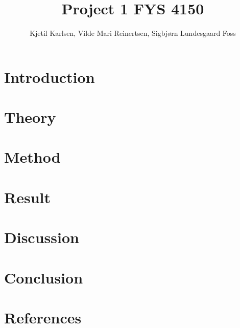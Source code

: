 

\title{Project 1 FYS 4150}
\author{Kjetil Karlsen, Vilde Mari Reinertsen, Sigbjørn Lundesgaard Foss}
\raggedbottom



\maketitle

\begin{abstract}

\end{abstract}

\twocolumn

\section{Introduction}


\section{Theory}


\section{Method}


\section{Result}


\section{Discussion}


\section{Conclusion}


\section{References}

